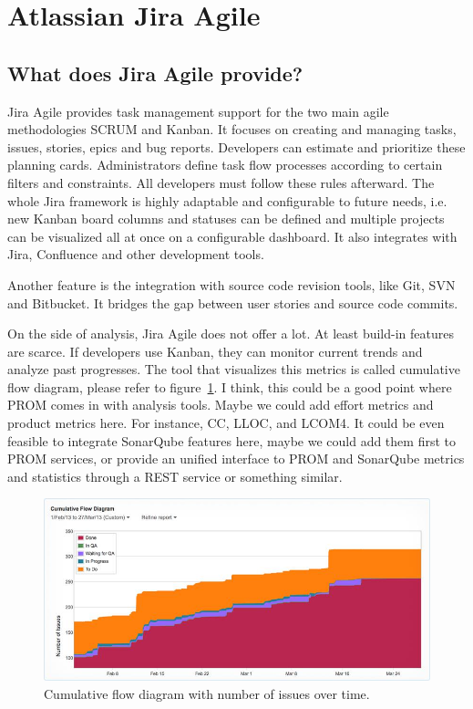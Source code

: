 \section{Atlassian Jira Agile}
\subsection{What does Jira Agile provide?}

Jira Agile provides task management support for the two main agile methodologies
SCRUM and Kanban. It focuses on creating and managing tasks, issues, stories,
epics and bug reports. Developers can estimate and prioritize these planning
cards. Administrators define task flow processes according to certain filters
and constraints. All developers must follow these rules afterward. The whole
Jira framework is highly adaptable and configurable to future needs, i.e. new
Kanban board columns and statuses can be defined and multiple projects can be
visualized all at once on a configurable dashboard. It also integrates with
Jira, Confluence and other development tools. 

Another feature is the integration with source code revision tools, like Git,
SVN and Bitbucket. It bridges the gap between user stories and source code
commits.

On the side of analysis, Jira Agile does not offer a lot. At least build-in features are scarce. If developers use Kanban, they can monitor current trends and analyze past progresses. The tool that visualizes this metrics is called cumulative flow diagram, please refer to figure~\ref{fig:cumulative_flow_diagram}. I think, this could be a good point where PROM comes in with analysis tools. Maybe we could add effort metrics and product metrics here. For instance, CC, LLOC, and LCOM4. It could be even feasible to integrate SonarQube features here, maybe we could add them first to PROM services, or provide an unified interface to PROM and SonarQube metrics and statistics through a REST service or something similar.

\begin{figure}[h]
	\centering
	\includegraphics[scale=0.5]{img/cumulative_flow_diagram.jpg}
	\caption{Cumulative flow diagram with number of issues over time.} 
	\label{fig:cumulative_flow_diagram}
\end{figure}

